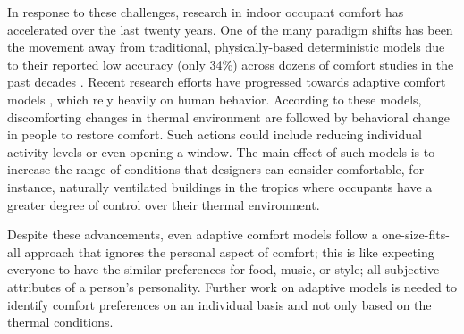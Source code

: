 \documentclass[]{interact}
\theoremstyle{plain}%
\theoremstyle{definition}
\theoremstyle{remark}
\begin{document}


In response to these challenges, research in indoor occupant comfort has accelerated over the last twenty years. One of the many paradigm shifts has been the movement away from traditional, physically-based deterministic models due to their reported low accuracy (only 34\%) across dozens of comfort studies in the past decades \citep{CHEUNG2019205,FOLDVARYLICINA2018502}. Recent research efforts have progressed towards adaptive comfort models \citep{Ferrari2012AdaptiveIndices, Nicol2013AdaptiveWorld, vanHoof2010ThermalPractice}, which rely heavily on human behavior. According to these models, discomforting changes in thermal environment are followed by behavioral change in people to restore comfort. Such actions could include reducing individual activity levels or even opening a window. The main effect of such models is to increase the range of conditions that designers can consider comfortable, for instance, naturally ventilated buildings in the tropics where occupants have a greater degree of control over their thermal environment.

Despite these advancements, even adaptive comfort models follow a one-size-fits-all approach that ignores the personal aspect of comfort; this is like expecting everyone to have the similar preferences for food, music, or style; all subjective attributes of a person’s personality. Further work on adaptive models is needed to identify comfort preferences on an individual basis and not only based on the thermal conditions.  
\end{document}
